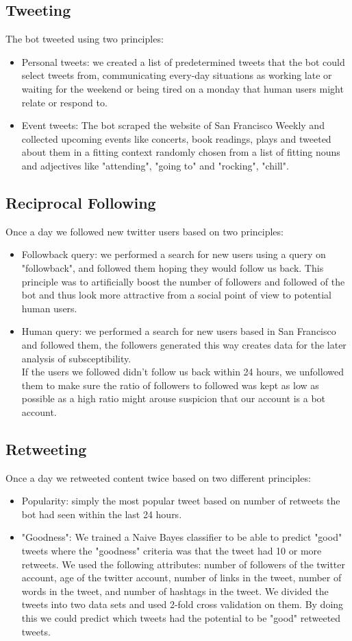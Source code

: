 \documentclass[10pt]{IEEEtran}
\begin{document}
\subsection{Tweeting}
The bot tweeted using two principles:
\begin{itemize}
\item Personal tweets: we created a list of predetermined tweets that the bot could select tweets from, communicating every-day situations as working late or waiting for the weekend or being tired on a monday that human users might relate or respond to.
\item Event tweets: The bot scraped the website of San Francisco Weekly and collected upcoming events like concerts, book readings, plays and tweeted about them in a fitting context randomly chosen from a list of fitting nouns and adjectives like "attending", "going to" and "rocking", "chill".
\end{itemize}
\subsection{Reciprocal Following}
Once a day we followed new twitter users based on two principles:
\begin{itemize}
\item Followback query: we performed a search for new users using a query on "followback", and followed them hoping they would follow us back. This principle was to artificially boost the number of followers and followed of the bot and thus look more attractive from a social point of view to potential human users.
\item Human query: we performed a search for new users based in San Francisco and followed them, the followers generated this way creates data for the later analysis of subsceptibility.\\
 If the users we followed didn't follow us back within 24 hours, we unfollowed them to make sure the ratio of followers to followed was kept as low as possible as a high ratio might arouse suspicion that our account is a bot account.
\end{itemize}
\subsection{Retweeting}
Once a day we retweeted content twice based on two different principles:
\begin{itemize}
\item Popularity: simply the most popular tweet based on number of retweets the bot had seen within the last 24 hours.
\item "Goodness": We trained a Naive Bayes classifier to be able to predict "good" tweets where the "goodness" criteria was that the tweet had 10 or more retweets. We used the following attributes: number of followers of the twitter account, age of the twitter account, number of links in the tweet, number of words in the tweet, and number of hashtags in the tweet. We divided the tweets into two data sets and used 2-fold cross validation on them. By doing this we could predict which tweets had the potential to be "good" retweeted tweets.
\end{itemize}
\end{document}
